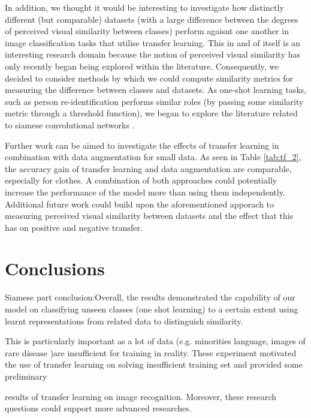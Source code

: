 \documentclass{article}
\begin{document}
In addition, we thought it would be interesting to investigate how distinctly different (but comparable) datasets (with a large difference between the degrees of perceived visual similarity between classes) perform agaisnt one another in image classification tasks that utilise transfer learning. This in and of itself is an interesting research domain because the notion of perceived visual similarity has only recently began being explored within the literature. Consequently, we decided to consider methods by which we could compute similarity metrics for measuring the difference between classes and datasets. As one-shot learning tasks, such as person re-identification \cite{ahmed2015improved} performs similar roles (by passing some similarity metric through a threshold function), we began to explore the literature related to siamese convolutional networks \cite{koch}.

Further work can be aimed to investigate the effects of transfer learning in combination with data augmentation for small data. As seen in Table \ref{tab:tf_2}, the accuracy gain of transfer learning and data augmentation are comparable, especially for clothes. A combination of both approaches could potentially increase the performance of the model more than using them independently. Additional future work could build upon the aforementioned apporach to measuring perceived visual similarity between datasets and the effect that this has on positive and negative transfer.

\section{Conclusions}
\label{sec:conclusions}

Siamese part conclusion:Overall, the results demonstrated the capability of our model on classifying unseen classes (one shot learning) to a certain extent using learnt representations from related data to distinguish similarity.

This is particularly important as a lot of data (e.g. minorities language, images of rare disease )are insufficient for training in reality. These experiment motivated the use of transfer learning on solving insufficient training set and provided some preliminary 

results of transfer learning on image recognition. Moreover, these research questions could support more advanced researches.

%

\end{document}
